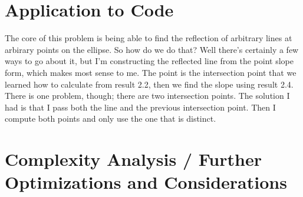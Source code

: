\documentclass[11pt, oneside]{article}   	%
\begin{document}
\section{Application to Code}
	The core of this problem is being able to find the reflection of arbitrary lines at arbirary points on the 
	ellipse. So how do we do that? Well there's certainly a few ways to go about it, but I'm constructing the 
	reflected line from the point slope form, which makes most sense to me. The point is the intersection point
	that we learned how to calculate from result 2.2, then we find the slope using result 2.4. There is one problem,
	though; there are two intersection points. The solution I had is that I pass both the line and the previous 
	intersection point. Then I compute both points and only use the one that is distinct.
	

\section{Complexity Analysis / Further Optimizations and Considerations}
\end{document}
